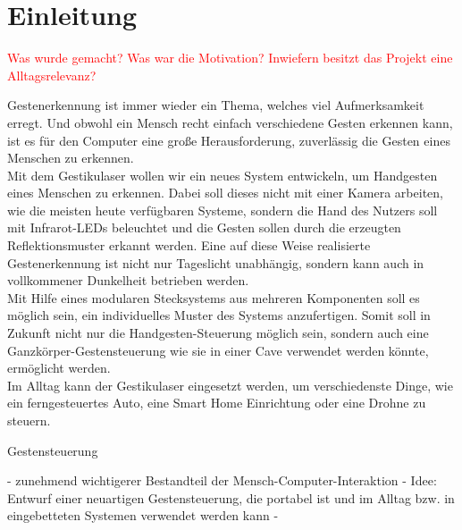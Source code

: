 \chapter{Einleitung}
\label{ch:Einleitung}

\textcolor{red}{Was wurde gemacht? Was war die Motivation? Inwiefern besitzt das Projekt eine Alltagsrelevanz?}

Gestenerkennung ist immer wieder ein Thema, welches viel Aufmerksamkeit erregt. Und obwohl ein Mensch recht einfach verschiedene Gesten erkennen kann, ist es für den Computer eine große Herausforderung, zuverlässig die Gesten eines Menschen zu erkennen. \\
Mit dem Gestikulaser wollen wir ein neues System entwickeln, um Handgesten eines Menschen zu erkennen. Dabei soll dieses nicht mit einer Kamera arbeiten, wie die meisten heute verfügbaren Systeme, sondern die Hand des Nutzers soll mit Infrarot-LEDs beleuchtet und die Gesten sollen durch die erzeugten Reflektionsmuster erkannt werden. Eine auf diese Weise realisierte Gestenerkennung ist nicht nur Tageslicht unabhängig, sondern kann auch in vollkommener Dunkelheit betrieben werden. \\
Mit Hilfe eines modularen Stecksystems aus mehreren Komponenten soll es möglich sein, ein individuelles Muster des Systems anzufertigen. Somit soll in Zukunft nicht nur die Handgesten-Steuerung möglich sein, sondern auch eine Ganzkörper-Gestensteuerung wie sie in einer Cave verwendet werden könnte, ermöglicht werden. \\

Im Alltag kann der Gestikulaser eingesetzt werden, um verschiedenste Dinge, wie ein ferngesteuertes Auto, eine Smart Home Einrichtung oder eine Drohne zu steuern. 


Gestensteuerung

- zunehmend wichtigerer Bestandteil der Mensch-Computer-Interaktion
- Idee: Entwurf einer neuartigen Gestensteuerung, die portabel ist und im Alltag bzw. in eingebetteten Systemen verwendet werden kann
- 